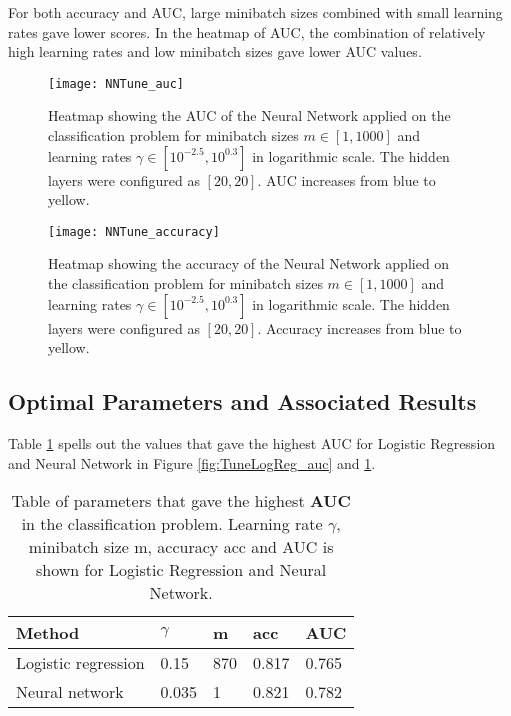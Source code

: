 For both accuracy and AUC, large minibatch sizes combined with small learning rates gave lower scores. In the heatmap of AUC, the combination of relatively high learning rates and low minibatch sizes gave lower AUC values.
\begin{figure}[htbp]
	\centering
	\texttt{[image: NNTune\_auc]}
	\caption{Heatmap showing the AUC of the Neural Network applied on the classification problem for minibatch sizes $m\in[1, 1000]$ and learning rates $\gamma\in[10^{-2.5}, 10^{0.3}]$ in logarithmic scale. The hidden layers were configured as $[20, 20]$. AUC increases from blue to yellow.}
	\label{fig:TuneNN_auc}
\end{figure}

\begin{figure}[htbp]
	\centering
	\texttt{[image: NNTune\_accuracy]}
	\caption{Heatmap showing the accuracy of the Neural Network applied on the classification problem for minibatch sizes $m\in[1, 1000]$ and learning rates $\gamma\in[10^{-2.5}, 10^{0.3}]$ in logarithmic scale. The hidden layers were configured as $[20, 20]$. Accuracy increases from blue to yellow.}
	\label{fig:TuneNN_accuracy}
\end{figure}

\subsection*{Optimal Parameters and Associated Results}
Table \ref{tab:AUC} spells out the values that gave the highest AUC for Logistic Regression and Neural Network in Figure \ref{fig:TuneLogReg_auc} and \ref{fig:TuneNN_auc}.
\begin{table}[htbp]
	\renewcommand{\arraystretch}{1.2}
	\centering
	\caption{Table of parameters that gave the highest \textbf{AUC} in the classification problem. Learning rate $\gamma$, minibatch size m, accuracy acc and AUC is shown for Logistic Regression and Neural Network.}
	\begin{tabular}{p{18mm} p{10mm} p{10mm} p{10mm} p{10mm}}
		\toprule
		Method & $\gamma$ & m & acc & AUC \\
		\midrule
		Logistic \newline regression & 0.15 & 870 & 0.817 & 0.765 \\
		Neural \newline network & 0.035 & 1 & 0.821 & 0.782 \\
		\bottomrule
	\end{tabular}
	\label{tab:AUC}
\end{table}

